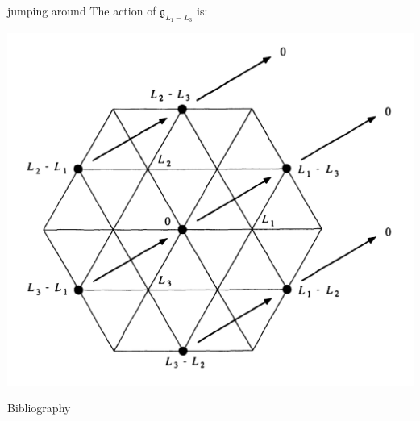 \documentclass{beamer}
\begin{document}
\begin{frame}{jumping around}
	The action of $\mathfrak{g}_{L_1-L_3}$ is:
	\begin{center} \includegraphics[scale=.3]{L1-L3.png}\end{center}
\end{frame}

\begin{frame}{Bibliography}
	\nocite{*}
	
\end{frame}
\end{document}
